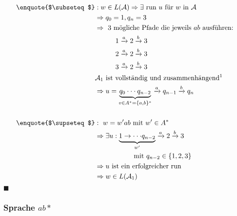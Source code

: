 \documentclass{scrartcl}
\begin{document}
\begin{align*}
  \text{\enquote{$\subseteq$}}&: w \in L(\mathcal{A}) \Rightarrow \exists \text{ run } u \text{ für } w \text{ in } \mathcal{A}\\
  &\Rightarrow q_0 = 1, q_n = 3\\
  &\Rightarrow \text{ 3 mögliche Pfade die jeweils $ab$ ausführen: }\\
    &\hspace{3em}1 \xrightarrow{a} 2 \xrightarrow{b} 3\\
    &\hspace{3em}2 \xrightarrow{a} 2 \xrightarrow{b} 3\\
    &\hspace{3em}3 \xrightarrow{a} 2 \xrightarrow{b} 3\\
  &\text{$\mathcal{A}_1$ ist vollständig und zusammenhängend\footnotemark}\\
  &\Rightarrow u = \underbrace{q_0 \cdot\cdot\cdot q_{n-2}}_{v \in A^* = \{a, b\}^*} \xrightarrow{a} q_{n-1} \xrightarrow{b} q_n\\
  \\
  \text{\enquote{$\supseteq$}}&:\ w = w' ab \text{ mit } w' \in A^*\\
  &\Rightarrow \exists u: \underbrace{1 \rightarrow \cdot\cdot\cdot q_{n-2}}_{w'} \xrightarrow{a} 2 \xrightarrow{b} 3\\
    &\hspace{2cm}\text{mit } q_{n-2} \in \{1, 2, 3\}\\
  &\Rightarrow \text{$u$ ist ein erfolgreicher run}\\
  &\Rightarrow w \in L(\mathcal{A}_1)\\
\end{align*}
\hfill$\blacksquare$

\subsubsection{Sprache $ab*$}
\end{document}
